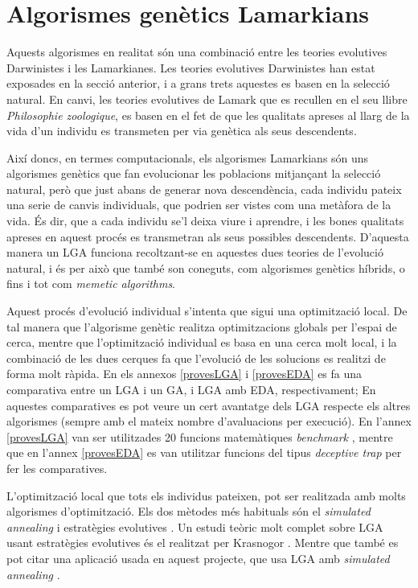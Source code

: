 \documentclass[titlepage,a4paper,12pt]{book}
\begin{document}
\section{Algorismes genètics Lamarkians} Aquests algorismes en realitat són una
combinació entre les teories evolutives Darwinistes i les Lamarkianes. Les
teories evolutives Darwinistes han estat exposades en la secció anterior, i a
grans trets aquestes es basen en la selecció natural. En canvi, les teories
evolutives de Lamark que es recullen en el seu llibre \emph{Philosophie
zoologique}, es basen en el fet de que les qualitats apreses al llarg de la vida
d'un individu es transmeten per via genètica als seus descendents.

Així doncs, en termes computacionals, els algorismes Lamarkians són uns
algorismes genètics que fan evolucionar les poblacions mitjançant la selecció
natural, però que just abans de generar nova descendència, cada individu pateix
una serie de canvis individuals, que podrien ser vistes com una metàfora de la
vida. És dir, que a cada individu se'l deixa viure i aprendre, i les bones
qualitats apreses en aquest procés es transmetran als seus possibles
descendents. D'aquesta manera un LGA funciona recoltzant-se en aquestes dues
teories de l'evolució natural, i és per això que també son coneguts, com
algorismes genètics híbrids, o fins i tot com \emph{memetic algorithms}.

Aquest procés d'evolució individual s'intenta que sigui una optimització local.
De tal manera que l'algorisme genètic realitza optimitzacions globals per
l'espai de cerca, mentre que l'optimització individual es basa en una cerca molt
local, i la combinació de les dues cerques fa que l'evolució de les solucions es
realitzi de forma molt ràpida. En els annexos \ref{provesLGA} i \ref{provesEDA}
es fa una comparativa entre un LGA i un GA, i LGA amb EDA, respectivament; En
aquestes comparatives es pot veure un cert avantatge dels LGA respecte els
altres algorismes (sempre amb el mateix nombre d'avaluacions per execució). En
l'annex \ref{provesLGA} van ser utilitzades 20 funcions matemàtiques
\emph{benchmark} \cite{YL97}, mentre que en l'annex \ref{provesEDA} es van
utilitzar funcions del tipus \emph{deceptive trap} \cite{36} per fer les
comparatives.

L'optimització local que tots els individus pateixen, pot ser realitzada amb
molts algorismes d'optimització. Els dos mètodes més habituals són el
\emph{simulated annealing} \cite{AKM97} i estratègies evolutives
\cite{Schwefel:1977}. Un estudi teòric molt complet sobre LGA usant estratègies
evolutives  és el realitzat per Krasnogor \cite{K02}. Mentre que també es pot
citar una aplicació usada en aquest projecte, que usa LGA amb \emph{simulated
annealing} \cite{MGHHHBO98}.
\end{document}
